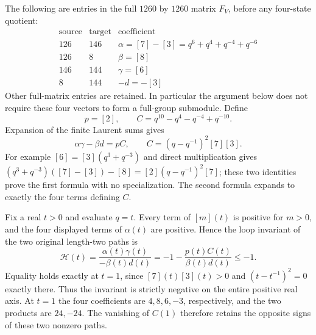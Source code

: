 The following are entries in the full $1260$ by $1260$ matrix $F_V$,
before any four-state quotient:
\[
\begin{array}{c|c|c}
\text{source}&\text{target}&\text{coefficient}\\\hline
126&146&\alpha=[7]-[3]=q^6+q^4+q^{-4}+q^{-6}\\
126&8&\beta=[8]\\
146&144&\gamma=[6]\\
8&144&-d=-[3]
\end{array}
\]
Other full-matrix entries are retained. In particular the argument
below does not require these four vectors to form a full-group
submodule. Define
\[
 p=[2],\qquad C=q^{10}-q^4-q^{-4}+q^{-10}.
\]
Expansion of the finite Laurent sums gives
\begin{equation}\label{eq:positive-source-path-identity}
 \alpha\gamma-\beta d=pC,
 \qquad C=(q-q^{-1})^2[7][3].
\end{equation}
For example $[6]=[3](q^3+q^{-3})$ and direct multiplication gives
$(q^3+q^{-3})([7]-[3])-[8]=[2](q-q^{-1})^2[7]$;
these two identities prove the first formula with no specialization.
The second formula expands to exactly the four terms defining $C$.

Fix a real $t>0$ and evaluate $q=t$. Every term of $[m](t)$ is
positive for $m>0$, and the four displayed terms of $\alpha(t)$ are
positive. Hence the loop invariant of the two original length-two paths is
\begin{equation}\label{eq:positive-source-holonomy}
 \mathcal H(t)=\frac{\alpha(t)\gamma(t)}{-\beta(t)d(t)}
 =-1-\frac{p(t)C(t)}{\beta(t)d(t)}\leq-1.
\end{equation}
Equality holds exactly at $t=1$, since $[7](t)[3](t)>0$ and
$(t-t^{-1})^2=0$ exactly there. Thus the invariant is strictly negative
on the entire positive real axis. At $t=1$ the four coefficients are
$4,8,6,-3$, respectively, and the two products are $24,-24$.
The vanishing of $C(1)$ therefore retains the opposite signs of these
two nonzero paths.

